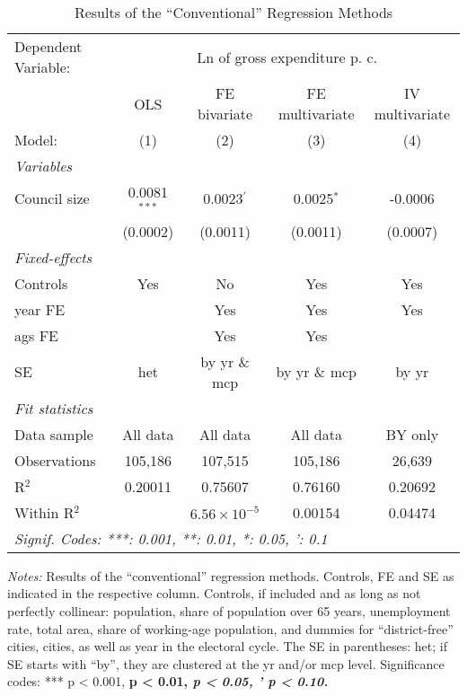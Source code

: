 
\begin{table}[htbp]
   \caption{\label{tab:conv_results} Results of the ``Conventional'' Regression Methods}
   \centering
   \begin{tabular}{lcccc}
      \tabularnewline \midrule \midrule
      Dependent Variable: & \multicolumn{4}{c}{Ln of gross expenditure p. c.}\\
                    & \acs{OLS}      & \acs{FE} bivariate    & \acs{FE} multivariate  & \acs{IV} multivariate \\    
      Model:        & (1)            & (2)                   & (3)                    & (4)\\  
      \midrule
      \emph{Variables}\\
      Council size  & 0.0081$^{***}$ & 0.0023$^{'}$          & 0.0025$^{*}$           & -0.0006\\   
                    & (0.0002)       & (0.0011)              & (0.0011)               & (0.0007)\\   
      \midrule
      \emph{Fixed-effects}\\
      Controls      & Yes            & No                    & Yes                    & Yes\\  
      year \ac{FE}  &                & Yes                   & Yes                    & Yes\\  
      ags \ac{FE}   &                & Yes                   & Yes                    & \\  
      \acs{SE} & \acs{het} & by \acs{yr} \& \acs{mcp} & by \acs{yr} \& \acs{mcp} & by \acs{yr}\\
      \midrule
      \emph{Fit statistics}\\
      Data sample   & All data       & All data              & All data               & \acs{BY} only\\   
      Observations  & 105,186        & 107,515               & 105,186                & 26,639\\  
      R$^2$         & 0.20011        & 0.75607               & 0.76160                & 0.20692\\  
      Within R$^2$  &                & $6.56\times 10^{-5}$  & 0.00154                & 0.04474\\  
      \midrule \midrule
      \multicolumn{5}{l}{\emph{Signif. Codes: ***: 0.001, **: 0.01, *: 0.05, ': 0.1}}\\
   \end{tabular}
   
   \par \raggedright 
   \footnotesize{\textit{Notes:} Results of the ``conventional'' regression methods. Controls, \ac{FE} and \ac{SE} as indicated in the respective column. Controls, if included and as long as not perfectly collinear: population, share of population over 65 years, unemployment rate, total area, share of working-age population, and dummies for ``district-free'' cities, cities, as well as year in the electoral cycle. The \acl{SE} in parentheses: \ac{het}; if \ac{SE} starts with ``by'', they are clustered at the \ac{yr} and/or \ac{mcp} level. Significance codes: *** p < 0.001, \textbf{ p < 0.01, \textit{ p < 0.05, ' p < 0.10.}}}
\end{table}


